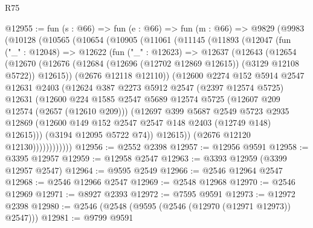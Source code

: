 \begin{lexlean}{R75}
\begin{coremodule}
@12955 := fun (s : @66) =>
  fun (e : @66) =>
  fun (m : @66) =>
  @9829
    (@9983
      (@10128
        (@10565
          (@10654
            (@10905
              (@11061
                (@11145
                  (@11893
                    (@12047
                      (fun ("_" : @12048) =>
                      @12622
                        (fun ("_" : @12623) =>
                        @12637
                          (@12643
                            (@12654
                              (@12670
                                (@12676
                                  (@12684 (@12696 (@12702 @12869 @12615)) (@3129 @12108 @5722))
                                  @12615))
                              (@2676 @12118 @12110))
                            (@12600
                              @2274
                              @152
                              @5914
                              @2547
                              @12631
                              @2403
                              (@12624
                                @387
                                @2273
                                @5912
                                @2547
                                (@2397 @12574 @5725)
                                @12631
                                (@12600
                                  @224
                                  @1585
                                  @2547
                                  @5689
                                  @12574
                                  @5725
                                  (@12607 @209 @12574 (@2657 (@12610 @209)))
                                  (@12697
                                    @399
                                    @5687
                                    @2549
                                    @5723
                                    @2935
                                    @12869
                                    (@12600 @149 @152 @2547 @2547 @148 @2403 (@12749 @148) @12615)))
                                (@3194 @12095 @5722 @74))
                              @12615))
                          (@2676 @12120 @12130))))))))))))
@12956 := @2552 @2398
@12957 := @12956 @9591
@12958 := @3395 @12957
@12959 := @12958 @2547
@12963 := @3393 @12959 (@3399 @12957 @2547)
@12964 := @9595 @2549
@12966 := @2546 @12964 @2547
@12968 := @2546 @12966 @2547
@12969 := @2548 @12968
@12970 := @2546 @12969
@12971 := @8927 @2393
@12972 := @7595 @9591
@12973 := @12972 @2398
@12980 := @2546 (@2548 (@9595 (@2546 (@12970 (@12971 @12973)) @2547)))
@12981 := @9799 @9591

\end{coremodule}
\end{lexlean}
